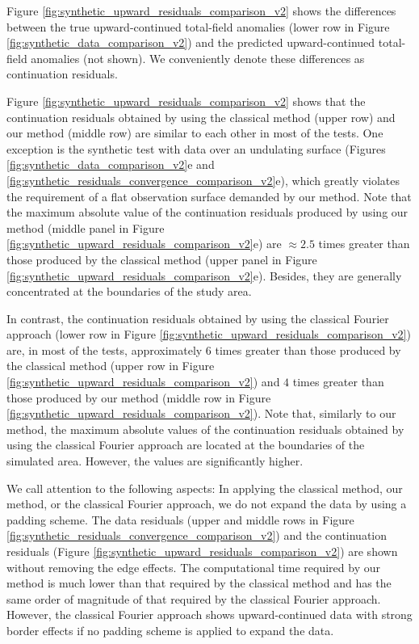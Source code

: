 \documentclass[manuscript]{geophysics}
\begin{document}
	Figure \ref{fig:synthetic_upward_residuals_comparison_v2} shows the differences
	between the true upward-continued total-field anomalies (lower row in Figure
	\ref{fig:synthetic_data_comparison_v2}) and the predicted upward-continued total-field 
	anomalies (not shown). We conveniently denote these differences as continuation
	residuals.
	
	
	Figure \ref{fig:synthetic_upward_residuals_comparison_v2} shows that the continuation residuals 
	obtained by using the classical method (upper row) and our method (middle row) are 
	similar to each other in most of the tests.
	One exception is the synthetic test with data over an undulating surface 
	(Figures \ref{fig:synthetic_data_comparison_v2}e and 
	\ref{fig:synthetic_residuals_convergence_comparison_v2}e), which greatly violates the 
	requirement of a flat observation surface demanded by our method.
	Note that the maximum absolute value of the continuation residuals produced by using our 
	method (middle panel in Figure \ref{fig:synthetic_upward_residuals_comparison_v2}e) 
	are $\approx 2.5$ times greater than those produced by the classical method 
	(upper panel in Figure \ref{fig:synthetic_upward_residuals_comparison_v2}e).
	Besides, they are generally concentrated at the boundaries of the study area.
	
	
	In contrast, the continuation residuals obtained by using the 
	classical Fourier approach (lower row in Figure \ref{fig:synthetic_upward_residuals_comparison_v2})
	are, in most of the tests, approximately $6$ times greater than those produced by the classical method 
	(upper row in Figure \ref{fig:synthetic_upward_residuals_comparison_v2}) and $4$ times greater than
	those produced by our method (middle row in Figure \ref{fig:synthetic_upward_residuals_comparison_v2}).
	Note that, similarly to our method, the maximum absolute values of the continuation residuals 
	obtained by using the classical Fourier approach are located at the boundaries of the simulated area.
	However, the values are significantly higher.
	
	We call attention to the following aspects:
	In applying the classical method, our method, or the classical Fourier approach, we do not expand 
	the data by using a padding scheme.
	The data residuals (upper and middle rows in Figure 
	\ref{fig:synthetic_residuals_convergence_comparison_v2}) 
	and the continuation residuals (Figure \ref{fig:synthetic_upward_residuals_comparison_v2}) are
	shown without removing the edge effects. 
	The computational time required by our method is much lower than that required by the classical method
	and has the same order of magnitude of that required by the classical Fourier approach.
	However, the classical Fourier approach shows upward-continued data with strong border effects 
	if no padding scheme is applied to expand the data. 
	
\end{document}
